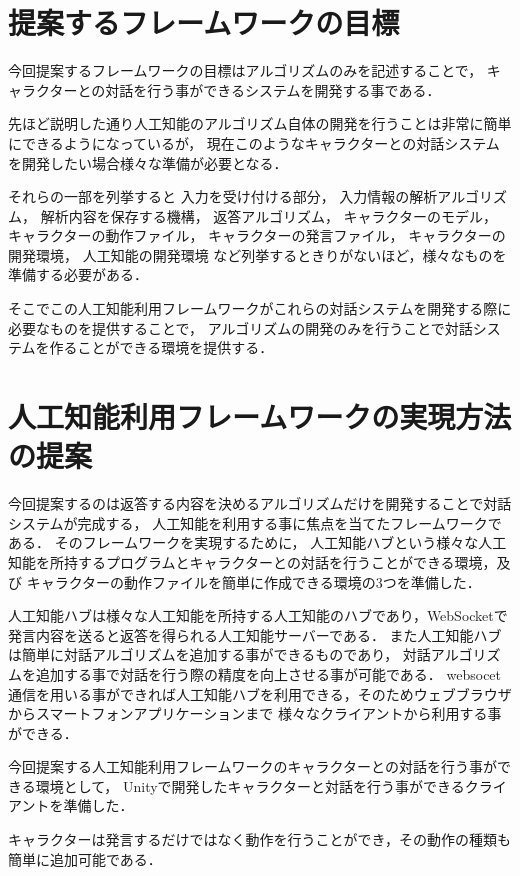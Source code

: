 \section{提案するフレームワークの目標}
今回提案するフレームワークの目標はアルゴリズムのみを記述することで，
キャラクターとの対話を行う事ができるシステムを開発する事である．

先ほど説明した通り人工知能のアルゴリズム自体の開発を行うことは非常に簡単にできるようになっているが，
現在このようなキャラクターとの対話システムを開発したい場合様々な準備が必要となる．

それらの一部を列挙すると
入力を受け付ける部分，
入力情報の解析アルゴリズム，
解析内容を保存する機構，
返答アルゴリズム，
キャラクターのモデル，
キャラクターの動作ファイル，
キャラクターの発言ファイル，
キャラクターの開発環境，
人工知能の開発環境
など列挙するときりがないほど，様々なものを準備する必要がある．

そこでこの人工知能利用フレームワークがこれらの対話システムを開発する際に必要なものを提供することで，
アルゴリズムの開発のみを行うことで対話システムを作ることができる環境を提供する．

\section{人工知能利用フレームワークの実現方法の提案}
今回提案するのは返答する内容を決めるアルゴリズムだけを開発することで対話システムが完成する，
人工知能を利用する事に焦点を当てたフレームワークである．
そのフレームワークを実現するために，
人工知能ハブという様々な人工知能を所持するプログラムとキャラクターとの対話を行うことができる環境，及び
キャラクターの動作ファイルを簡単に作成できる環境の3つを準備した．

人工知能ハブは様々な人工知能を所持する人工知能のハブであり，WebSocketで発言内容を送ると返答を得られる人工知能サーバーである．
また人工知能ハブは簡単に対話アルゴリズムを追加する事ができるものであり，
対話アルゴリズムを追加する事で対話を行う際の精度を向上させる事が可能である．
websocet通信を用いる事ができれば人工知能ハブを利用できる，そのためウェブブラウザからスマートフォンアプリケーションまで
様々なクライアントから利用する事ができる．

今回提案する人工知能利用フレームワークのキャラクターとの対話を行う事ができる環境として，
Unityで開発したキャラクターと対話を行う事ができるクライアントを準備した．

キャラクターは発言するだけではなく動作を行うことができ，その動作の種類も簡単に追加可能である．


